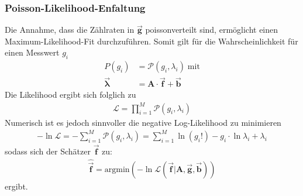\subsubsection{Poisson-Likelihood-Enfaltung}
Die Annahme, dass die Zählraten in $\vec{\pmb{g}}$ poissonverteilt sind, ermöglicht einen Maximum-Likelihood-Fit durchzuführen. Somit gilt für die Wahrscheinlichkeit für einen Messwert $g_{i}$
\begin{align}
	P(g_{i}) &= \mathcal{P}(g_{i},\lambda_{i}) \; \text{mit}\\
	\vec{\pmb{\lambda}} &= \pmb{A} \cdot \vec{\pmb{f}} + \vec{\pmb{b}}
\end{align}
Die Likelihood ergibt sich folglich zu
\begin{align}
	\mathcal{L} = \prod_{i=1}^{M}\mathcal{P}(g_{i},\lambda_{i})
\end{align}
Numerisch ist es jedoch sinnvoller die negative Log-Likelihood zu minimieren
\begin{align}
	- \ln\mathcal{L} = - \sum_{i=1}^{M}\mathcal{P}(g_{i},\lambda_{i}) = \sum_{i=1}^{M}\ln(g_{i}!) - g_{i} \cdot \ln \lambda_{i} +\lambda_{i}
	\label{eqn:loglike}
\end{align}
sodass sich der Schätzer $\vec{\pmb{f}}$ zu:
\begin{align}
	\hat{\vec{\pmb{f}}} = \text{argmin}\left(- \ln\mathcal{L}( \vec{\pmb{f}}|\pmb{A},\vec{\pmb{g}},\vec{\pmb{b}})\right)
	\label{eqn:fLike}
\end{align}
ergibt.
